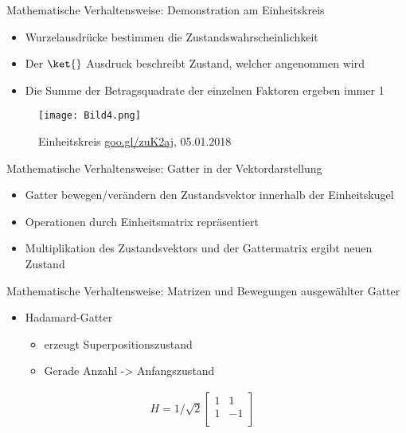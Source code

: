 \documentclass[]{beamer}
\begin{document}
\begin{frame}{Mathematische Verhaltensweise: Demonstration am Einheitskreis}%
\begin{center}
	\begin{itemize}
	 \item Wurzelausdrücke bestimmen die Zustandswahrscheinlichkeit
     \item Der $\ket{}$ Ausdruck beschreibt Zustand, welcher angenommen wird
     \item Die Summe der Betragsquadrate der einzelnen Faktoren ergeben immer 1 %
\end{itemize}
\begin{figure}
  		\texttt{[image: Bild4.png]}
 	 	\caption{Einheitskreis \newline\footnotesize{\url{goo.gl/zuK2aj}, 05.01.2018}}
 	 	\centering
  	\end{figure}
\end{center}
\end{frame}

 \begin{frame}{Mathematische Verhaltensweise: Gatter in der Vektordarstellung}
\begin{center}
	\begin{itemize}
	\item Gatter bewegen/verändern den Zustandsvektor innerhalb der Einheitskugel
    \item Operationen durch Einheitsmatrix repräsentiert
    \item Multiplikation des Zustandsvektors und der Gattermatrix ergibt neuen Zustand
	\end{itemize}
\end{center}
\end{frame}

\begin{frame}{Mathematische Verhaltensweise: Matrizen und Bewegungen ausgewählter Gatter}
\begin{center}%
	\begin{itemize}
	\item Hadamard-Gatter \begin{itemize}
    \item erzeugt Superpositionszustand
	\item Gerade Anzahl -> Anfangszustand
	\end{itemize}
	\end{itemize}
    \begin{align*}
H= 1/\sqrt{2} \begin{bmatrix} 1&1\\1&-1\\\end{bmatrix} &
\end{align*}
\end{center}
\end{frame}
\end{document}
